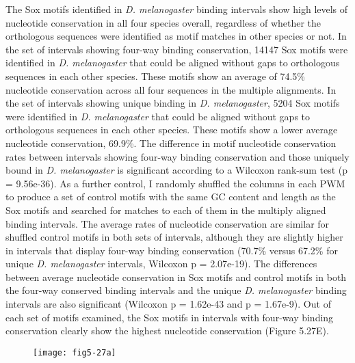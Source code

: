 The Sox motifs identified in \emph{D. melanogaster} binding intervals show high levels of nucleotide conservation in all four species overall, regardless of whether the orthologous sequences were identified as motif matches in other species or not. In the set of intervals showing four-way binding conservation, 14147 Sox motifs were identified in \emph{D. melanogaster} that could be aligned without gaps to orthologous sequences in each other species. These motifs show an average of 74.5\% nucleotide conservation across all four sequences in the multiple alignments. In the set of intervals showing unique binding in \emph{D. melanogaster}, 5204 Sox motifs were identified in \emph{D. melanogaster} that could be aligned without gaps to orthologous sequences in each other species. These motifs show a lower average nucleotide conservation, 69.9\%. The difference in motif nucleotide conservation rates between intervals showing four-way binding conservation and those uniquely bound in \emph{D. melanogaster} is significant according to a Wilcoxon rank-sum test (p = 9.56e-36). As a further control, I randomly shuffled the columns in each PWM to produce a set of control motifs with the same GC content and length as the Sox motifs and searched for matches to each of them in the multiply aligned binding intervals. The average rates of nucleotide conservation are similar for shuffled control motifs in both sets of intervals, although they are slightly higher in intervals that display four-way binding conservation (70.7\% versus 67.2\% for unique \emph{D. melanogaster} intervals, Wilcoxon p = 2.07e-19). The differences between average nucleotide conservation in Sox motifs and control motifs in both the four-way conserved binding intervals and the unique \emph{D. melanogaster} binding intervals are also significant (Wilcoxon p = 1.62e-43
 and p = 1.67e-9). Out of each set of motifs examined, the Sox motifs in intervals with four-way binding conservation clearly show the highest nucleotide conservation (Figure 5.27E).\\

\begin{figure}[H]
\centering
\texttt{[image: fig5-27a]}
\label{Figure 5.27}
\end{figure}


